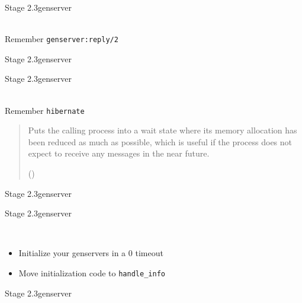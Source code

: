 \documentclass[utf8,hyperref={colorlinks=true}]{beamer}
\newenvironment{aquote}[1]{%
  \pushQED{#1}%
  \begin{quote}
}{%
  \par\noindent\hfill(\popQED)%
  \end{quote}%
}
\begin{document}
\begin{frame}{Stage 2.3}{gen\textunderscore server}
	\begin{description}
		\item<+->[Queued Calls]\ \\
			Remember \texttt{gen\textunderscore server:reply/2}
	\end{description}
\end{frame}
\begin{frame}{Stage 2.3}{gen\textunderscore server}
\reply
\end{frame}
\begin{frame}{Stage 2.3}{gen\textunderscore server}
	\begin{description}
		\item<+->[Memory Footprint]\ \\
			Remember \texttt{hibernate}~\\
	\end{description}
	\begin{aquote}{Erlang Docs}
		Puts the calling process into a wait state where its memory allocation has been reduced as much as possible, which is useful if the process does not expect to receive any messages in the near future.
	\end{aquote}
\end{frame}
\begin{frame}{Stage 2.3}{gen\textunderscore server}
\hibernate
\end{frame}
\begin{frame}{Stage 2.3}{gen\textunderscore server}
	\begin{description}
		\item<+->[Long startup time]\ \\
			\begin{itemize}
				\item Initialize your gen\textunderscore servers in a $0$ timeout
				\item Move initialization code to \texttt{handle\_info}
			\end{itemize}
	\end{description}
\end{frame}
\begin{frame}{Stage 2.3}{gen\textunderscore server}
\init
\end{frame}
\end{document}
